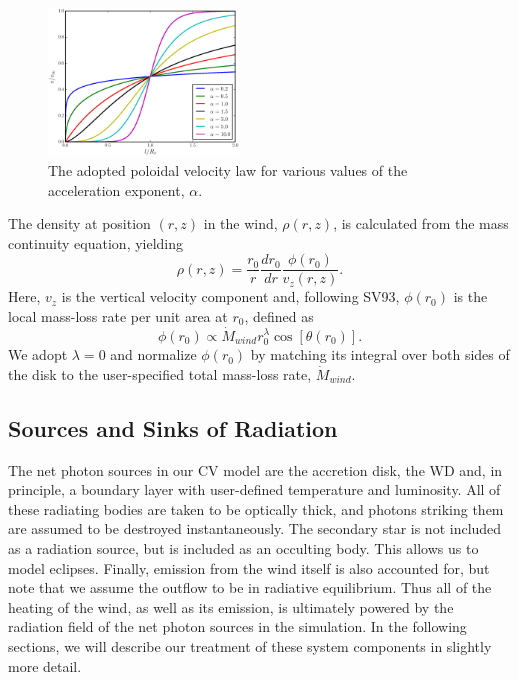 \documentclass[preprint, a4paper, 11pt]{aastex}
\begin{document}
\begin{figure}
\centering
\includegraphics[width=0.45\textwidth]{figures/acc_law.eps}
\caption{
The adopted poloidal velocity law for various values of the
acceleration exponent, $\alpha$.
} 
\label{acc_law}
\end{figure}

The density at position $(r,z)$ in the wind, $\rho(r,z)$, is
calculated from the mass continuity equation, yielding
\begin{equation}
\rho(r,z) = \frac{r_0}{r} \frac{dr_0}{dr} \frac{\phi(r_0)}{v_z(r,z)}.
\label{density}
\end{equation}
Here, 
$v_z$ is the vertical velocity component and, following SV93,
$\phi(r_0)$ is the local mass-loss rate per unit area at $r_0$, 
defined as
\begin{equation}
\phi(r_0) \propto \dot{M}_{wind} r_0^\lambda \cos [\theta(r_0)].
\label{density}
\end{equation}
We adopt $\lambda = 0$ and normalize $\phi(r_0)$ by 
matching its integral over both sides of the disk
to the user-specified total mass-loss rate, $\dot{M}_{wind}$. 


\subsection{Sources and Sinks of Radiation}
\label{radsources}

The net photon sources in our CV model are the accretion disk, the
WD and, in principle, a boundary layer with user-defined temperature
and luminosity. All of these radiating bodies are taken to be
optically thick, and photons striking them are assumed to be destroyed
instantaneously. The secondary star is not included as a radiation
source, but is included as an occulting body. This allows us to model
eclipses. Finally, emission from the wind itself is also accounted for, but
note that we assume the outflow to be in radiative equilibrium. Thus all
of the heating of the wind, as well as its emission, is ultimately
powered by the radiation field of the net photon sources in the
simulation. In the following sections, we will describe our treatment
of these system components in slightly more detail.
\end{document}
